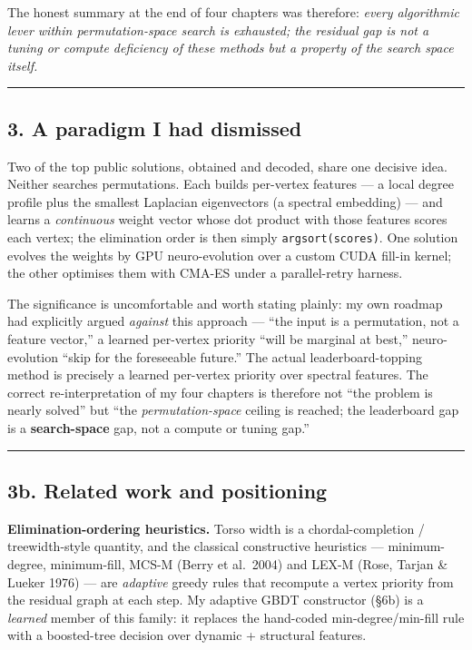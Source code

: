 \documentclass[
  11pt,
]{article}
\begin{document}
The honest summary at the end of four chapters was therefore:
\emph{every algorithmic lever within permutation-space search is
exhausted; the residual gap is not a tuning or compute deficiency of
these methods but a property of the search space itself.}

\begin{center}\rule{0.5\linewidth}{0.5pt}\end{center}

\hypertarget{a-paradigm-i-had-dismissed}{%
\subsection{3. A paradigm I had
dismissed}\label{a-paradigm-i-had-dismissed}}

Two of the top public solutions, obtained and decoded, share one
decisive idea. Neither searches permutations. Each builds per-vertex
features --- a local degree profile plus the smallest Laplacian
eigenvectors (a spectral embedding) --- and learns a \emph{continuous}
weight vector whose dot product with those features scores each vertex;
the elimination order is then simply \texttt{argsort(scores)}. One
solution evolves the weights by GPU neuro-evolution over a custom CUDA
fill-in kernel; the other optimises them with CMA-ES under a
parallel-retry harness.

The significance is uncomfortable and worth stating plainly: my own
roadmap had explicitly argued \emph{against} this approach --- ``the
input is a permutation, not a feature vector,'' a learned per-vertex
priority ``will be marginal at best,'' neuro-evolution ``skip for the
foreseeable future.'' The actual leaderboard-topping method is precisely
a learned per-vertex priority over spectral features. The correct
re-interpretation of my four chapters is therefore not ``the problem is
nearly solved'' but ``the \emph{permutation-space} ceiling is reached;
the leaderboard gap is a \textbf{search-space} gap, not a compute or
tuning gap.''

\begin{center}\rule{0.5\linewidth}{0.5pt}\end{center}

\hypertarget{b.-related-work-and-positioning}{%
\subsection{3b. Related work and
positioning}\label{b.-related-work-and-positioning}}

\textbf{Elimination-ordering heuristics.} Torso width is a
chordal-completion / treewidth-style quantity, and the classical
constructive heuristics --- minimum-degree, minimum-fill, MCS-M (Berry
et al.~2004) and LEX-M (Rose, Tarjan \& Lueker 1976) --- are
\emph{adaptive} greedy rules that recompute a vertex priority from the
residual graph at each step. My adaptive GBDT constructor (§6b) is a
\emph{learned} member of this family: it replaces the hand-coded
min-degree/min-fill rule with a boosted-tree decision over dynamic +
structural features.
\end{document}
